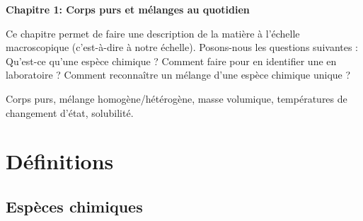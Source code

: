 
\renewcommand{\thesubsection}{\textcolor{red}{\Roman{section}.\arabic{subsection}}}
\renewcommand{\thesubsubsection}{\textcolor{red}{\Roman{section}.\arabic{subsection}.\alph{subsubsection}}}

\setcounter{section}{0}
\sndEnTeteCoursUn

\begin{center}
\begin{mdframed}[style=titr, leftmargin=60pt, rightmargin=60pt, innertopmargin=7pt, innerbottommargin=7pt, innerrightmargin=8pt, innerleftmargin=8pt]

\begin{center}
\large{\textbf{Chapitre 1: Corps purs et mélanges au quotidien}}
\end{center}

\end{mdframed}
\end{center}
Ce chapitre permet de faire une description de la matière à l'échelle macroscopique (c'est-à-dire à notre échelle). Posons-nous les questions suivantes : Qu'est-ce qu'une espèce chimique ? Comment faire pour en identifier une en laboratoire ? Comment reconnaître un mélange d'une espèce chimique unique ?
%
\begin{tcolorbox}[colback=blue!5!white,colframe=blue!75!black,title=Mots clés du chapitre :]
Corps purs, mélange homogène/hétérogène, masse volumique, températures de changement d'état, solubilité.
\end{tcolorbox}

%

\section{Définitions}

\subsection{Espèces chimiques}

